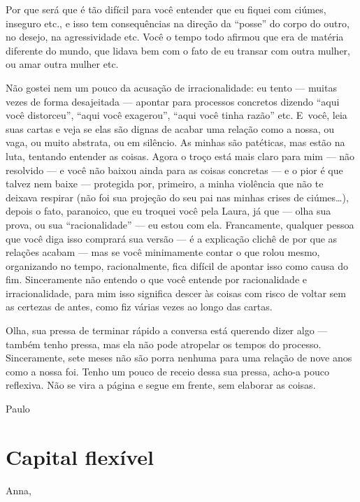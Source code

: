 Por que será que é tão difícil para você entender que eu fiquei com
ciúmes, inseguro etc., e isso tem consequências na direção da ``posse''
do corpo do outro, no desejo, na agressividade etc. Você o tempo todo
afirmou que era de matéria diferente do mundo, que lidava bem com o fato
de eu transar com outra mulher, ou amar outra mulher etc.

Não gostei nem um pouco da acusação de irracionalidade: eu tento ---
muitas vezes de forma desajeitada --- apontar para processos concretos
dizendo ``aqui você distorceu'', ``aqui você exagerou'', ``aqui você
tinha razão'' etc. E~você, leia suas cartas e veja se elas são dignas de
acabar uma relação como a nossa, ou vaga, ou muito abstrata, ou em
silêncio. As minhas são patéticas, mas estão na luta, tentando entender
as coisas. Agora o troço está mais claro para mim --- não resolvido ---
e você não baixou ainda para as coisas concretas --- e o pior é que
talvez nem baixe --- protegida por, primeiro, a minha violência que não
te deixava respirar (não foi sua projeção do seu pai nas minhas crises
de ciúmes…), depois o fato, paranoico, que eu troquei você pela
Laura, já que --- olha sua prova, ou sua ``racionalidade'' --- eu estou
com ela. Francamente, qualquer pessoa que você diga isso comprará sua
versão --- é a explicação clichê de por que as relações acabam --- mas
se você minimamente contar o que rolou mesmo, organizando no tempo,
racionalmente, fica difícil de apontar isso como causa do fim.
Sinceramente não entendo o que você entende por racionalidade e
irracionalidade, para mim isso significa descer às coisas com risco de
voltar sem as certezas de antes, como fiz várias vezes ao longo das
cartas.

Olha, sua pressa de terminar rápido a conversa está querendo dizer algo
--- também tenho pressa, mas ela não pode atropelar os tempos do
processo. Sinceramente, sete meses não são porra nenhuma para uma
relação de nove anos como a nossa foi. Tenho um pouco de receio dessa
sua pressa, acho-a pouco reflexiva. Não se vira a página e segue em
frente, sem elaborar as coisas.

\begin{flushright}Paulo\end{flushright}


\chapter{Capital flexível}

Anna,

\medskip{} 

